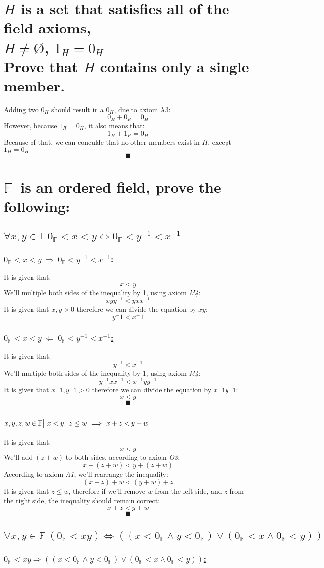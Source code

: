 \documentclass[a4paper, 12pt]{article}
\newcommand{\sub}[1]{\subsection{\underline{#1}}}
\newcommand{\subsub}[1]{\subsubsection{\underline{#1}}}
\newcommand{\?}{\stackrel{?}{=}}
\newcommand{\F}{\ensuremath{\mathbb{F}}}
\renewcommand{\qed}{$$\blacksquare$$}
\begin{document}
\section{$H$ is a set that satisfies all of the field axioms,\\
$H \neq \text{\O}$, $1_H=0_H$\\
Prove that $H$ contains only a single member.}
Adding two $0_H$ should result in a $0_H$, due to axiom A3: $$ 0_H + 0_H = 0_H $$
However, because $1_H=0_H$, it also means that: $$ 1_H + 1_H = 0_H $$
Because of that, we can conculde that no other members exist in $H$, except $1_H=0_H$
\qed

\section{\F~is an ordered field, prove the following:}

\sub{$\forall{x,y} \in{\F}~ 0_{\F}<x<y \iff 0_{\F}<y^{-1}<x^{-1} $}
\subsub{$0_{\F}<x<y ~\Longrightarrow~ 0_{\F}<y^{-1}<x^{-1} $:}
It is given that: $$ x<y $$
We'll multiple both sides of the inequality by 1, using axiom \textit{M4}: $$ xyy^{-1}<yxx^{-1} $$
It is given that $x,y > 0$ therefore we can divide the equation by $xy$: $$ y^-1 < x^-1 $$
\subsub{$0_{\F}<x<y ~\Longleftarrow~ 0_{\F}<y^{-1}<x^{-1} $:}
It is given that: $$ y^{-1}<x^{-1} $$
We'll multiple both sides of the inequality by 1, using axiom \textit{M4}: $$ y^{-1}xx^{-1}<x^{-1}yy^{-1} $$
It is given that $x^-1,y^-1 > 0$ therefore we can divide the equation by $x^-1y^-1$: $$ x<y $$
\qed\pagebreak

\sub{$ x,y,z,w \in \F \big{|}~ x<y,~z\leq{w} ~\Longrightarrow~ x+z<y+w$}
It is given that: $$ x<y $$
We'll add $(z+w)$ to both sides, according to axiom \textit{O3}: $$ x+(z+w) < y+(z+w) $$
According to axiom \textit{A1}, we'll rearrange the inequality: $$ (x+z)+w < (y+w)+z $$
It is given that $z \leq w$, therefore if we'll remove $w$ from the left side,
and $z$ from the right side, the inequality should remain correct:
$$ x+z < y+w $$
\qed

\sub{$ \forall{x,y} \in{\F}~ (0_{\F}<xy) \iff ((x<0_{\F} \land y<0_{\F}) \lor (0_{\F} < x \land 0_{\F}<y))  $}
\subsub{$ 0_{\F}<xy \Longrightarrow ((x<0_{\F} \land y<0_{\F}) \lor (0_{\F} < x \land 0_{\F}<y))$:}


\end{document}
